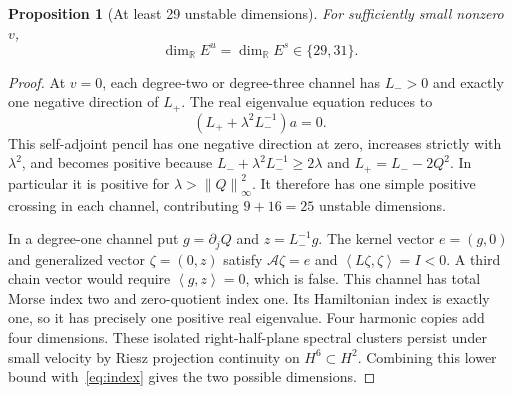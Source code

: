 \documentclass[11pt,a4paper]{article}
\newtheorem{proposition}[theorem]{Proposition}
\theoremstyle{remark}\newtheorem{remark}[theorem]{Remark}
\newcommand{\R}{\mathbb R}\newcommand{\C}{\mathbb C}
\newcommand{\norm}[1]{\left\|#1\right\|}
\newcommand{\ip}[2]{\left\langle #1,#2\right\rangle}
\begin{document}
\begin{proposition}[At least 29 unstable dimensions]\label{prop:29}
For sufficiently small nonzero $v$,
\[
 \dim_\R E^u=\dim_\R E^s\in\{29,31\}.
\]
\end{proposition}
\begin{proof}
At $v=0$, each degree-two or degree-three channel has $L_->0$ and exactly one negative direction of $L_+$. The real eigenvalue equation reduces to
\[
 (L_++\lambda^2L_-^{-1})a=0.
\]
This self-adjoint pencil has one negative direction at zero, increases strictly with $\lambda^2$, and becomes positive because
$L_-+\lambda^2L_-^{-1}\ge2\lambda$ and $L_+=L_--2Q^2$. In particular it is positive for $\lambda>\norm Q_\infty^2$. It therefore has one simple positive crossing in each channel, contributing $9+16=25$ unstable dimensions.

In a degree-one channel put $g=\partial_jQ$ and $z=L_-^{-1}g$. The kernel vector $e=(g,0)$ and generalized vector $\zeta=(0,z)$ satisfy $\mathcal A\zeta=e$ and $\ip{L\zeta}{\zeta}=I<0$. A third chain vector would require $\ip g z=0$, which is false. This channel has total Morse index two and zero-quotient index one. Its Hamiltonian index is exactly one, so it has precisely one positive real eigenvalue. Four harmonic copies add four dimensions. These isolated right-half-plane spectral clusters persist under small velocity by Riesz projection continuity on $H^6\subset H^2$. Combining this lower bound with~\eqref{eq:index} gives the two possible dimensions.
\end{proof}
\end{document}
